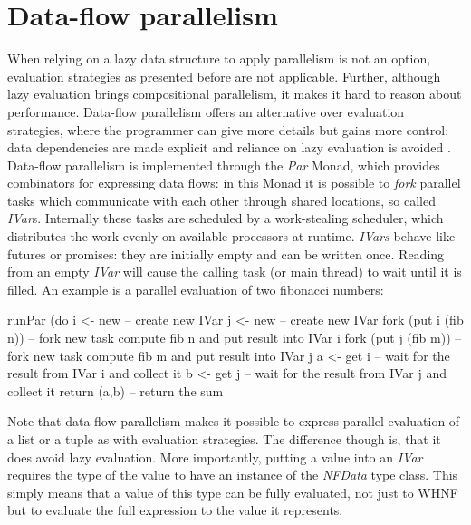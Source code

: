 \section{Data-flow parallelism}
When relying on a lazy data structure to apply parallelism is not an option, evaluation strategies as presented before are not applicable. Further, although lazy evaluation brings compositional parallelism, it makes it hard to reason about performance. Data-flow parallelism offers an alternative over evaluation strategies, where the programmer can give more details but gains more control: data dependencies are made explicit and reliance on lazy evaluation is avoided \cite{marlow_monad_2011}.
Data-flow parallelism is implemented through the \textit{Par} Monad, which provides combinators for expressing data flows: in this Monad it is possible to \textit{fork} parallel tasks which communicate with each other through shared locations, so called \textit{IVar}s. Internally these tasks are scheduled by a work-stealing scheduler, which distributes the work evenly on available processors at runtime. \textit{IVars} behave like futures or promises: they are initially empty and can be written once. Reading from an empty \textit{IVar} will cause the calling task (or main thread) to wait until it is filled. An example is a parallel evaluation of two fibonacci numbers:

\begin{HaskellCode}
runPar (do
  i <- new             -- create new IVar
  j <- new             -- create new IVar
  fork (put i (fib n)) -- fork new task compute fib n and put result into IVar i
  fork (put j (fib m)) -- fork new task compute fib m and put result into IVar j
  a <- get i           -- wait for the result from IVar i and collect it
  b <- get j           -- wait for the result from IVar j and collect it
  return (a,b)         -- return the sum
\end{HaskellCode}

Note that data-flow parallelism makes it possible to express parallel evaluation of a list or a tuple as with evaluation strategies. The difference though is, that it does avoid lazy evaluation. More importantly, putting a value into an \textit{IVar} requires the type of the value to have an instance of the \textit{NFData} type class. This simply means that a value of this type can be fully evaluated, not just to WHNF but to evaluate the full expression to the value it represents.

